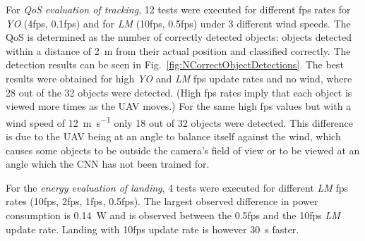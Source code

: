 \documentclass[conference]{IEEEtran}
\begin{document}
For \emph{QoS evaluation of tracking}, 12 tests were executed for different 
fps rates for \emph{YO}
 (4fps, 0.1fps) and for 
\emph{LM}
 (10fps, 0.5fps) under 
3 different wind speeds. 
%
The QoS is determined as the number of correctly detected objects: objects detected within a distance of \SI{2}{\meter} from their actual position and classified correctly. 
%
The detection results can be seen in
Fig.~\ref{fig:NCorrectObjectDetections}. The best results were
obtained for high \emph{YO} and \emph{LM} fps update rates  %
and no wind, where 28 out of the 32
objects were detected. %
(High fps rates imply that each object is viewed more times as the UAV moves.) %
For the same high fps values but with a wind speed of \SI{12}{\meter \per \second} only 18 out of 32 objects were detected. This difference is due to the UAV %
being at an angle to balance itself against the wind, which causes some objects to be outside the camera's field of view or to be viewed at an angle which the CNN has not been trained for.


For the \emph{energy evaluation of landing}, 4 tests were executed for different 
\emph{LM} fps rates 
(10fps, 2fps, 1fps, 0.5fps). %
%
%
The largest observed difference in 
power consumption is \SI{0.14}{\watt} and is observed between the 0.5fps and
the 10fps \emph{LM} update rate.
Landing with
10fps update
rate is however \SI{30}{\second} faster. %
\end{document}
